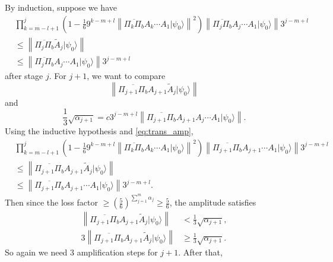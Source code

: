 \documentclass[letterpaper,onecolumn,11pt,accepted=2026-02-14]{quantumarticle}
\newcommand{\norm}[1]{\left\lVert#1\right\rVert}
\theoremstyle{remark}
\theoremstyle{plain}
\newcommand{\eq}[1]{\cref{eq:#1}}
\newcommand{\ket}[1]{|#1\rangle}
\begin{document}
By induction, suppose we have
\begin{equation}
\begin{aligned}
    &\prod_{k=m-l+1}^{j}\left(1-\frac{1}{6}9^{k-m+l}\norm{\overline{\Pi_{k}\Pi_b}A_k\cdots A_1\ket{\psi_0}}^2\right)\norm{\overline{\Pi_{j}\Pi_b}A_{j}\cdots A_1\ket{\psi_0}}3^{j-m+l}\\
    &\leq\norm{\overline{\Pi_{j}\Pi_b}\widetilde A_{j}\ket{\psi_0}}\\
    &\leq\norm{\overline{\Pi_{j}\Pi_b}A_{j}\cdots A_1\ket{\psi_0}}3^{j-m+l}
\end{aligned}
\end{equation}
after stage $j$. For $j+1$, we want to compare
\begin{equation}
    \norm{\overline{\Pi_{j+1}\Pi_b}A_{j+1}\widetilde A_{j}\ket{\psi_0}}
\end{equation}
and
\begin{equation}
    \frac{1}{3}\sqrt{\alpha_{j+1}}
    =c3^{j-m+l}\norm{\overline{\Pi_{j+1}\Pi_b}A_{j+1}A_{j}\cdots A_1\ket{\psi_0}}.
\end{equation}
Using the inductive hypothesis and \eq{trans_amp},
\begin{equation}
\begin{aligned}
    &\prod_{k=m-l+1}^{j}\left(1-\frac{1}{6}9^{k-m+l}\norm{\overline{\Pi_{k}\Pi_b}A_k\cdots A_1\ket{\psi_0}}^2\right)\norm{\overline{\Pi_{j+1}\Pi_b}A_{j+1}\cdots A_1\ket{\psi_0}}3^{j-m+l}\\
    &\leq\norm{\overline{\Pi_{j+1}\Pi_b}A_{j+1}\widetilde A_{j}\ket{\psi_0}}\\
    &\leq\norm{\overline{\Pi_{j+1}\Pi_b}A_{j+1}\cdots A_1\ket{\psi_0}}3^{j-m+l}.
\end{aligned}
\end{equation}
Then since the loss factor $\geq\left(\frac{5}{6}\right)^{\sum_{j=1}^m\alpha_j}\geq\frac{5}{6}$, the amplitude satisfies
\begin{equation}
\begin{aligned}
    \norm{\overline{\Pi_{j+1}\Pi_b}A_{j+1}\widetilde A_{j}\ket{\psi_0}}&<\frac{1}{3}\sqrt{\alpha_{j+1}},\\
    3\norm{\overline{\Pi_{j+1}\Pi_b}A_{j+1}\widetilde A_{j}\ket{\psi_0}}&\geq\frac{1}{3}\sqrt{\alpha_{j+1}}.
\end{aligned}
\end{equation}
So again we need $3$ amplification steps for $j+1$. After that, 
\end{document}
